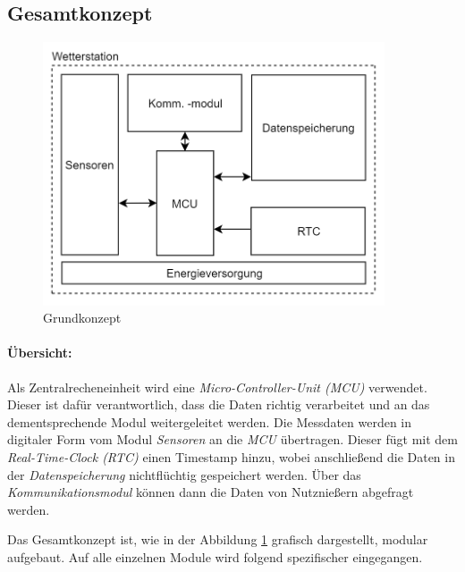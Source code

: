 \subsection{Gesamtkonzept}
\label{chap:grundkonzept}
\begin{figure}[h]
	\centering
	\includegraphics[width=0.9\textwidth]{graphics/Grundkonzept.PNG}
	\caption{Grundkonzept}
	\label{fig:grundkonzept}
\end{figure}

\paragraph{Übersicht:}
Als Zentralrecheneinheit wird eine \textit{Micro-Controller-Unit (MCU)} verwendet. Dieser ist dafür verantwortlich, dass die Daten richtig verarbeitet und an das dementsprechende Modul weitergeleitet werden. Die Messdaten werden in digitaler Form vom Modul \textit{Sensoren} an die \textit{MCU} übertragen. Dieser fügt mit dem \textit{Real-Time-Clock (RTC)} einen Timestamp hinzu, wobei anschließend die Daten in der \textit{Datenspeicherung} nichtflüchtig gespeichert werden. Über das \textit{Kommunikationsmodul} können dann die Daten von Nutznießern abgefragt werden.

Das Gesamtkonzept ist, wie in der Abbildung \ref{fig:grundkonzept} grafisch dargestellt, modular aufgebaut. Auf alle einzelnen Module wird folgend spezifischer eingegangen.\\
\newpage

